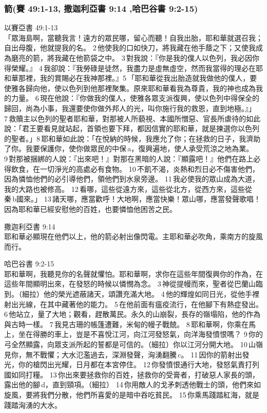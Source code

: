 \subsubsection{箭(賽 49:1-13, 撒迦利亞書 9:14 ,哈巴谷書 9:2-15)}
\begin{description}
\item 以賽亞書 49:1-13 \\
「眾海島啊，當聽我言！遠方的眾民哪，留心而聽！自我出胎，耶和華就選召我；自出母腹，他就提我的名。 2 他使我的口如快刀，將我藏在他手蔭之下；又使我成為磨亮的箭，將我藏在他箭袋之中。 3 對我說：『你是我的僕人以色列，我必因你得榮耀。』 4 我卻說：『我勞碌是徒然，我盡力是虛無虛空，然而我當得的理必在耶和華那裡，我的賞賜必在我神那裡。』5 「耶和華從我出胎造就我做他的僕人，要使雅各歸向他，使以色列到他那裡聚集。原來耶和華看我為尊貴，我的神也成為我的力量。 6 現在他說：『你做我的僕人，使雅各眾支派復興，使以色列中得保全的歸回，尚為小事，我還要使你做外邦人的光，叫你施行我的救恩，直到地極。』」 7 救贖主以色列的聖者耶和華，對那被人所藐視、本國所憎惡、官長所虐待的如此說：「君王要看見就站起，首領也要下拜，都因信實的耶和華，就是揀選你以色列的聖者。」8 耶和華如此說：「在悅納的時候，我應允了你；在拯救的日子，我濟助了你。我要保護你，使你做眾民的中保 a，復興遍地，使人承受荒涼之地為業。 9 對那被捆綁的人說：『出來吧！』對那在黑暗的人說：『顯露吧！』他們在路上必得飲食，在一切淨光的高處必有食物。 10 不飢不渴，炎熱和烈日必不傷害他們，因為憐恤他們的必引導他們，領他們到水泉旁邊。 11 我必使我的眾山成為大道，我的大路也被修高。 12 看哪，這些從遠方來，這些從北方，從西方來，這些從秦 b國來。」 13 諸天哪，應當歡呼！大地啊，應當快樂！眾山哪，應當發聲歌唱！因為耶和華已經安慰他的百姓，也要憐恤他困苦之民。
\item 撒迦利亞書 9:14 \\耶和華必顯現在他們以上，他的箭必射出像閃電。主耶和華必吹角，乘南方的旋風而行。
\item 哈巴谷書 9:2-15 \\耶和華啊，我聽見你的名聲就懼怕。耶和華啊，求你在這些年間復興你的作為，在這些年間顯明出來，在發怒的時候以憐憫為念。 3 神從提幔而來，聖者從巴蘭山臨到。（細拉）他的榮光遮蔽諸天，頌讚充滿大地。 4 他的輝煌如同日光，從他手裡射出光線，在其中藏著他的能力。 5 在他前面有瘟疫流行，在他腳下有熱症發出。 6 他站立，量了大地；觀看，趕散萬民。永久的山崩裂，長存的嶺塌陷，他的作為與古時一樣。 7 我見古珊的帳篷遭難，米甸的幔子戰兢。 8 耶和華啊，你乘在馬上，坐在得勝的車上，豈是不喜悅江河，向江河發怒氣，向洋海發憤恨嗎？ 9 你的弓全然顯露，向眾支派所起的誓都是可信的。（細拉）你以江河分開大地。 10 山嶺見你，無不戰懼；大水氾濫過去，深淵發聲，洶湧翻騰 c。 11 因你的箭射出發光，你的槍閃出光耀，日月都在本宮停住。 12 你發憤恨通行大地，發怒氣責打列國如同打糧。 13 你出來要拯救你的百姓，拯救你的受膏者，打破惡人家長的頭，露出他的腳 d，直到頸項。（細拉） 14 你用敵人的戈矛刺透他戰士的頭，他們來如旋風，要將我們分散，他們所喜愛的是暗中吞吃貧民。 15 你乘馬踐踏紅海，就是踐踏洶湧的大水。
\end{description}

